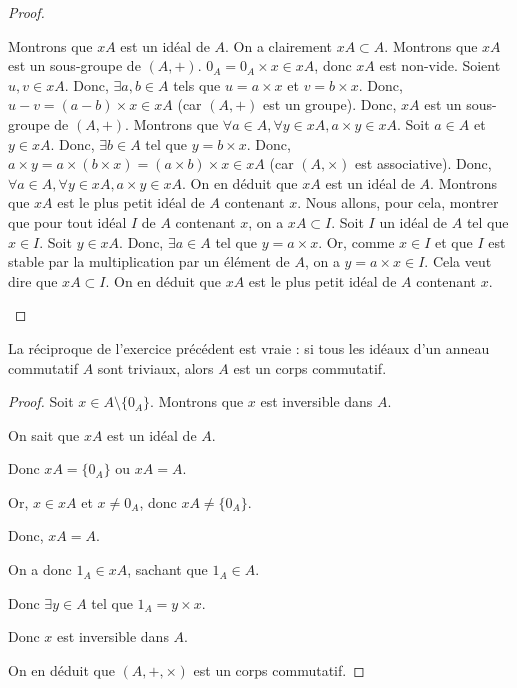 \documentclass[12pt, a4paper]{report}
\begin{document}
\begin{proof}
    \begin{outline}
        \1 Montrons que $xA$ est un idéal de $A$.
            \2 On a clairement $xA \subset A$.
            \2 Montrons que $xA$ est un sous-groupe de $(A,+)$.
                \3 $0_A = 0_A \times x \in xA$, donc $xA$ est non-vide.
                \3 Soient $u,v \in xA$. Donc, $\exists a,b \in A$ tels que $u = a \times x$ et $v = b \times x$.
                \3 Donc, $u - v = (a - b) \times x \in xA$ (car $(A,+)$ est un groupe).
            \2 Donc, $xA$ est un sous-groupe de $(A,+)$.
            \2 Montrons que $\forall a \in A, \forall y \in xA, a \times y \in xA$.
                \3 Soit $a \in A$ et $y \in xA$. Donc, $\exists b \in A$ tel que $y = b \times x$.
                \3 Donc, $a \times y = a \times (b \times x) = (a \times b) \times x \in xA$ (car $(A,\times)$ est associative).
            \2 Donc, $\forall a \in A, \forall y \in xA, a \times y \in xA$.
        \1 On en déduit que $xA$ est un idéal de $A$.
        \1 Montrons que $xA$ est le plus petit idéal de $A$ contenant $x$. Nous allons, pour cela, montrer que pour tout idéal $I$ de $A$ contenant $x$, on a $xA \subset I$.
            \2 Soit $I$ un idéal de $A$ tel que $x \in I$.
            \2 Soit $y \in xA$. Donc, $\exists a \in A$ tel que $y = a \times x$.
            \2 Or, comme $x \in I$ et que $I$ est stable par la multiplication par un élément de $A$, on a $y = a \times x \in I$. Cela veut dire que $xA \subset I$.
        \1 On en déduit que $xA$ est le plus petit idéal de $A$ contenant $x$.
    \end{outline}
\end{proof}

\begin{remark}
    La réciproque de l'exercice précédent est vraie : si tous les idéaux d'un anneau commutatif $A$ sont triviaux, alors $A$ est un corps commutatif.
\end{remark}

\begin{proof}
    Soit $x \in A\setminus\{0_A\}$. Montrons que $x$ est inversible dans $A$.

    On sait que $xA$ est un idéal de $A$.

    Donc $xA = \{0_A\}$ ou $xA = A$.

    Or, $x \in xA$ et $x \ne 0_A$, donc $xA \ne \{0_A\}$.

    Donc, $xA = A$.

    On a donc $1_A \in xA$, sachant que $1_A\in A$.

    Donc $\exists y \in A$ tel que $1_A = y \times x$.

    Donc $x$ est inversible dans $A$.

    On en déduit que $(A,+,\times)$ est un corps commutatif.
\end{proof}
\end{document}
